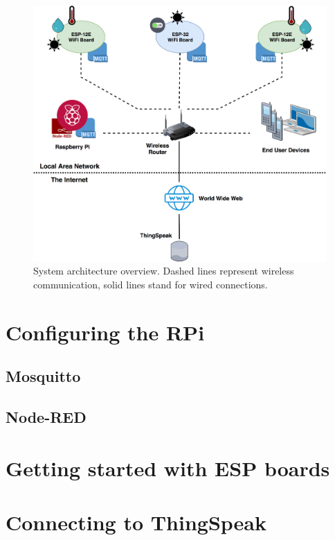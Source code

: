 \begin{figure}[H]
	\begin{center}
		\includegraphics[width=\textwidth]{./pictures/architecture_overview.png}
		\caption{System architecture overview. Dashed lines represent wireless communication, solid lines stand for wired connections.}
		\label{architecture_overview}
	\end{center}
\end{figure}

\section{Configuring the RPi}

\subsection{Mosquitto}
\subsection{Node-RED}
\section{Getting started with ESP boards}
\section{Connecting to ThingSpeak}
